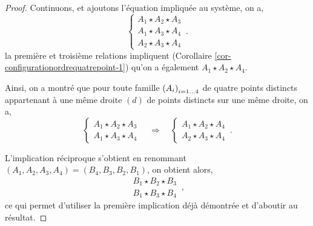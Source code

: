 \begin{cor}
\begin{proof}
        Continuons, et ajoutons l'équation impliquée au système, on a,
        \begin{equation*}
        \left\{
            \begin{array}{c}
                 A_1 \star A_2 \star A_3 \\
                 A_1 \star A_3 \star A_4 \\
                 A_2 \star A_3 \star A_4 
            \end{array}
            \right. \,.
        \end{equation*}
        la première et troisième relations impliquent (Corollaire \ref{cor-configurationordrequatrepoint-1}) qu'on a également $A_1 \star A_2 \star A_4$. 

        Ainsi, on a montré que pour toute famille $\left(A_{i}\right)_{i = 1\ldots 4}$ de quatre points distincts appartenant à une même droite $(d)$ de points distincts sur une même droite, on a,
            \begin{equation*}
        \left\{
            \begin{array}{c}
                 A_1 \star A_2 \star A_3 \\
                 A_1 \star A_3 \star A_4
            \end{array}
            \right. \quad \Longrightarrow \quad \left\{
            \begin{array}{c}
                A_1 \star A_2 \star A_4\\
                A_2 \star A_3 \star A_4
            \end{array}
            \right.
            \,.
    \end{equation*}

    L'implication réciproque s'obtient en renommant $(A_1,A_2,A_3,A_4)=(B_4,B_3,B_2,B_1)$, on obtient alors,
    \begin{equation*}
        \begin{array}{c}
                 B_1 \star B_2 \star B_3 \\
                 B_1 \star B_3 \star B_4
            \end{array}\,,
    \end{equation*}
    ce qui permet d'utiliser la première implication déjà démontrée et d'aboutir au résultat.
    \end{proof}
\end{cor}
